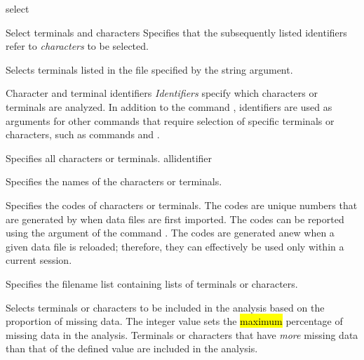 \begin{command}{select}{}
\begin{arguments}
\begin{argumentgroup}{Select terminals and characters}
                {Specifies that the subsequently listed identifiers
                refer to \emph{characters} to be selected.}
                {}

                {Selects terminals listed in the file specified by the string argument.}
                {}

		\end{argumentgroup}
		
        \begin{argumentgroup}{Character and terminal identifiers}\label{identifiers}
        {\emph{Identifiers} specify which characters or terminals are analyzed.
        In addition to the command , identifiers are used as
        arguments for other commands that require selection of specific terminals or
        characters, such as commands  and
        .}

                {Specifies all characters or terminals.}
                {allidentifier}

                {Specifies the names of the characters or terminals.}
                {}

                {Specifies the codes of characters or terminals. The codes are unique
                numbers that are generated by \poy when data files are first imported.
                The codes can be reported using the argument 
                of the command . The codes are generated anew
                when a given data file is reloaded; therefore, they can effectively be used
                only within a current \poy session.}
                {}

                {Specifies the filename list containing lists of terminals or
                characters.}
                {}

                {Selects terminals or characters to be included in the analysis
                based on the proportion of missing data. The
                integer value sets the \hl{maximum} percentage of missing
                data in the analysis. Terminals or characters that have \emph{more} missing data
                than that of the defined value are included in the analysis.}
                {}
               

\end{argumentgroup}
\end{arguments}
\end{command}
